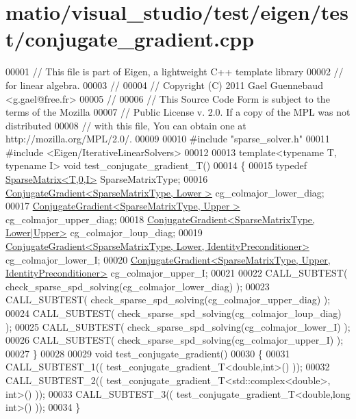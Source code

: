 \hypertarget{matio_2visual__studio_2test_2eigen_2test_2conjugate__gradient_8cpp_source}{}\section{matio/visual\+\_\+studio/test/eigen/test/conjugate\+\_\+gradient.cpp}
\label{matio_2visual__studio_2test_2eigen_2test_2conjugate__gradient_8cpp_source}

\begin{DoxyCode}
00001 \textcolor{comment}{// This file is part of Eigen, a lightweight C++ template library}
00002 \textcolor{comment}{// for linear algebra.}
00003 \textcolor{comment}{//}
00004 \textcolor{comment}{// Copyright (C) 2011 Gael Guennebaud <g.gael@free.fr>}
00005 \textcolor{comment}{//}
00006 \textcolor{comment}{// This Source Code Form is subject to the terms of the Mozilla}
00007 \textcolor{comment}{// Public License v. 2.0. If a copy of the MPL was not distributed}
00008 \textcolor{comment}{// with this file, You can obtain one at http://mozilla.org/MPL/2.0/.}
00009 
00010 \textcolor{preprocessor}{#include "sparse\_solver.h"}
00011 \textcolor{preprocessor}{#include <Eigen/IterativeLinearSolvers>}
00012 
00013 \textcolor{keyword}{template}<\textcolor{keyword}{typename} T, \textcolor{keyword}{typename} I> \textcolor{keywordtype}{void} test\_conjugate\_gradient\_T()
00014 \{
00015   \textcolor{keyword}{typedef} \hyperlink{group___sparse_core___module_class_eigen_1_1_sparse_matrix}{SparseMatrix<T,0,I>} SparseMatrixType;
00016   \hyperlink{group___iterative_linear_solvers___module_class_eigen_1_1_conjugate_gradient}{ConjugateGradient<SparseMatrixType, Lower      >} 
      cg\_colmajor\_lower\_diag;
00017   \hyperlink{group___iterative_linear_solvers___module_class_eigen_1_1_conjugate_gradient}{ConjugateGradient<SparseMatrixType, Upper      >} 
      cg\_colmajor\_upper\_diag;
00018   \hyperlink{group___iterative_linear_solvers___module_class_eigen_1_1_conjugate_gradient}{ConjugateGradient<SparseMatrixType, Lower|Upper>} 
      cg\_colmajor\_loup\_diag;
00019   \hyperlink{group___iterative_linear_solvers___module_class_eigen_1_1_conjugate_gradient}{ConjugateGradient<SparseMatrixType, Lower, IdentityPreconditioner>}
       cg\_colmajor\_lower\_I;
00020   \hyperlink{group___iterative_linear_solvers___module_class_eigen_1_1_conjugate_gradient}{ConjugateGradient<SparseMatrixType, Upper, IdentityPreconditioner>}
       cg\_colmajor\_upper\_I;
00021 
00022   CALL\_SUBTEST( check\_sparse\_spd\_solving(cg\_colmajor\_lower\_diag)  );
00023   CALL\_SUBTEST( check\_sparse\_spd\_solving(cg\_colmajor\_upper\_diag)  );
00024   CALL\_SUBTEST( check\_sparse\_spd\_solving(cg\_colmajor\_loup\_diag)   );
00025   CALL\_SUBTEST( check\_sparse\_spd\_solving(cg\_colmajor\_lower\_I)     );
00026   CALL\_SUBTEST( check\_sparse\_spd\_solving(cg\_colmajor\_upper\_I)     );
00027 \}
00028 
00029 \textcolor{keywordtype}{void} test\_conjugate\_gradient()
00030 \{
00031   CALL\_SUBTEST\_1(( test\_conjugate\_gradient\_T<double,int>() ));
00032   CALL\_SUBTEST\_2(( test\_conjugate\_gradient\_T<std::complex<double>, \textcolor{keywordtype}{int}>() ));
00033   CALL\_SUBTEST\_3(( test\_conjugate\_gradient\_T<double,long int>() ));
00034 \}
\end{DoxyCode}
